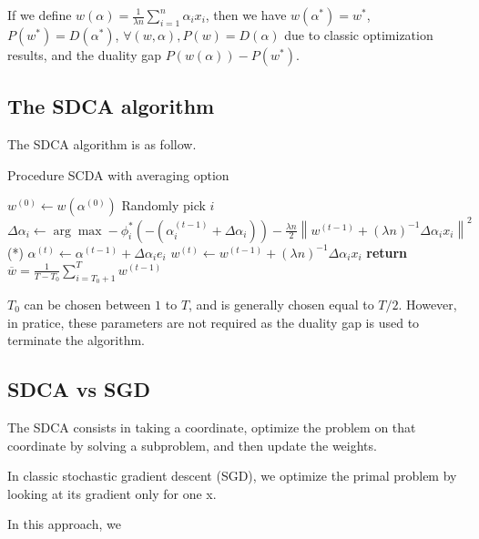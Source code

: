 \documentclass{article}
\newcommand{\norm}[1]{\left\|#1 \right\|}
\begin{document}
If we define $w(\alpha) = \frac{1}{\lambda n} \sum_{i=1}^n \alpha_ix_i$, then we have $w(\alpha^{*}) = w^{*}$, $P(w^{*}) = D(\alpha^{*})$, $\forall (w,\alpha), P(w) = D(\alpha)$ due to classic optimization results, and the duality gap $P(w(\alpha)) - P(w^{*})$.



\subsection{The SDCA algorithm}

The SDCA algorithm is as follow.

\begin{algorithm}
	\caption{Procedure SCDA with averaging option}
	\begin{algorithmic}
		\State $w^{(0)} \gets w(\alpha^{(0)})$
		\State Randomly pick $i$
		\State $\Delta \alpha_i \gets \arg \max -\phi^{*}_i(-(\alpha_i^{(t-1)}+\Delta \alpha_i))-\frac{\lambda n}{2}\norm{w^{(t-1)}+(\lambda n)^{-1}\Delta \alpha_i x_i}^2$ \qquad \qquad \qquad \qquad \qquad (*)
		\State $\alpha^{(t)} \gets \alpha^{(t-1)} + \Delta \alpha_i e_i$
		\State $w^{(t)} \gets w^{(t-1)} + (\lambda n)^{-1} \Delta \alpha_i x_i$
		\EndFor
		\State \textbf{return} $\overline{w} = \frac{1}{T-T_0} \sum_{i = T_0+1}^T w^{(t-1)}$
		\EndProcedure
	\end{algorithmic}
\end{algorithm}

$T_0$ can be chosen between $1$ to $T$, and is generally chosen equal to $T/2$.
However, in pratice, these parameters are not required as the duality gap is used to terminate the algorithm.


\subsection{SDCA vs SGD}

The SDCA consists in taking a coordinate, optimize the problem on that coordinate by solving a subproblem, and then update the weights.

In classic stochastic gradient descent (SGD), we optimize the primal problem by looking at its gradient only for one x.

In this approach, we 


\newpage
\end{document}
